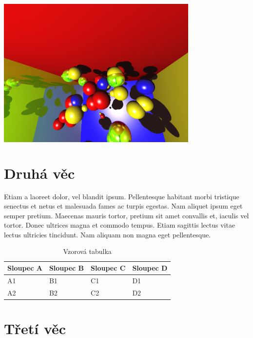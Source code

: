 \documentclass[12pt,a4paper,titlepage,final]{report}
\begin{document}
\begin{center}
    \captionsetup{type=figure}
        \includegraphics[width=10cm]{images/sample.jpg}
\end{center}

\section{Druhá věc}

Etiam a laoreet dolor, vel blandit ipsum. Pellentesque habitant morbi tristique senectus et netus et malesuada fames ac turpis egestas. Nam aliquet ipsum eget semper pretium. Maecenas mauris tortor, pretium sit amet convallis et, iaculis vel tortor. Donec ultrices magna et commodo tempus. Etiam sagittis lectus vitae lectus ultricies tincidunt. Nam aliquam non magna eget pellentesque.

\begin{table}[h!]
    \begin{center}
    \begin{tabular}{ | p{3.5cm} | p{3.5cm} | p{3.5cm} | p{3.5cm} |}
    \hline
    Sloupec A & Sloupec B & Sloupec C & Sloupec D
    \\ \hline

    A1 & B1 & C1 & D1
    \\ \hline

    A2 & B2 & C2 & D2
    \\ \hline

    \end{tabular}
    \end{center}
    \caption{Vzorová tabulka}
\end{table}

\section{Třetí věc}
\end{document}
